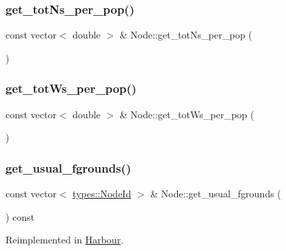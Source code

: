 \mbox{\label{class_node_a8e0f7d5b6e585c9890c8b011f1ad9817}} 
\subsubsection{\texorpdfstring{get\_totNs\_per\_pop()}{get\_totNs\_per\_pop()}}
{\footnotesize\ttfamily const vector$<$ double $>$ \& Node\+::get\+\_\+tot\+Ns\+\_\+per\+\_\+pop (\begin{DoxyParamCaption}{ }\end{DoxyParamCaption})}

\mbox{\label{class_node_aec476404f336f54ea258dc70f07674aa}} 
\subsubsection{\texorpdfstring{get\_totWs\_per\_pop()}{get\_totWs\_per\_pop()}}
{\footnotesize\ttfamily const vector$<$ double $>$ \& Node\+::get\+\_\+tot\+Ws\+\_\+per\+\_\+pop (\begin{DoxyParamCaption}{ }\end{DoxyParamCaption})}

\mbox{\label{class_node_ac1c3ddd1751f913d42655888b7bbc24f}} 
\subsubsection{\texorpdfstring{get\_usual\_fgrounds()}{get\_usual\_fgrounds()}}
{\footnotesize\ttfamily const vector$<$ \mbox{\hyperlink{classtypes_1_1_node_id}{types\+::\+Node\+Id}} $>$ \& Node\+::get\+\_\+usual\+\_\+fgrounds (\begin{DoxyParamCaption}{ }\end{DoxyParamCaption}) const\hspace{0.3cm}{\ttfamily [virtual]}}



Reimplemented in \mbox{\hyperlink{class_harbour_ad7369a9ec8a9032dbdd99e2d945415de}{Harbour}}.

\mbox{\label{class_node_a604f051bec95c8ba70e5d5461c9599a3}} 
